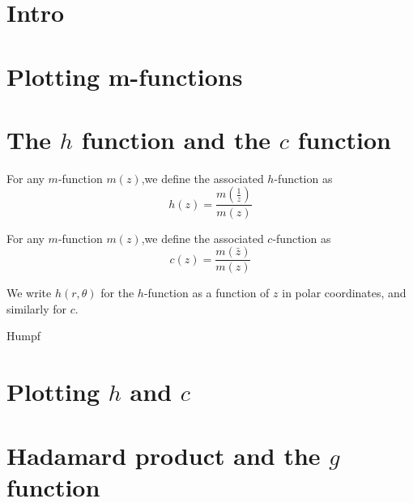 \documentclass[a4paper]{amsart}
\begin{document}
\section{Intro}


\section{Plotting m-functions}


\section{The $h$ function and the $c$ function}

\begin{definition}
For any $m$-function $m(z)$,we define the associated $h$-function as
$$ h(z) = \frac{m(\frac{1}{z})}{m(z) }  $$

\end{definition}

\begin{definition}
For any $m$-function $m(z)$,we define the associated $c$-function as
$$c(z) = \frac{m(\bar{z})}{m(z)}$$

\end{definition}

We write $h(r, \theta)$ for the $h$-function as a function of $z$ in polar coordinates, and similarly for $c$.

\begin{proposition}
Humpf

\end{proposition}

\section{Plotting $h$ and $c$}




\section{Hadamard product and the $g$ function}
\end{document}
